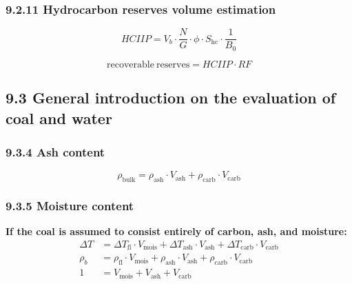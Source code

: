 \subsubsection{9.2.11 Hydrocarbon reserves volume estimation}
\begin{equation*}
    \mathit{HCIIP} = V_b\cdot \frac{N}{G} \cdot\phi\cdot S_\mathrm{hc}\cdot\frac{1}{B_0}\tag{9A.17}
\end{equation*}

\begin{equation*}
    \mathrm{recoverable\ reserves} = \mathit{HCIIP}\cdot \mathit{RF}\tag{9A.18}
\end{equation*}

\subsection{9.3 General introduction on the evaluation of coal and water}
\subsubsection{9.3.4 Ash content}
\begin{equation*}
    \rho_\mathrm{bulk} = \rho_\mathrm{ash}\cdot V_\mathrm{ash} + \rho_\mathrm{carb}\cdot V_\mathrm{carb}\tag{9B.1}
\end{equation*}

\subsubsection{9.3.5 Moisture content}
\textbf{If the coal is assumed to consist entirely of carbon, ash, and moisture:}
% 
% 
\begin{align}
    \Delta T & = \Delta T_\mathrm{fl}\cdot V_\mathrm{mois} + \Delta T_\mathrm{ash}\cdot V_\mathrm{ash} + \Delta T_\mathrm{carb}\cdot V_\mathrm{carb}\tag{9B.2} \\
    \rho_b   & = \rho_\mathrm{fl}\cdot V_\mathrm{mois} + \rho_\mathrm{ash}\cdot V_\mathrm{ash} + \rho_\mathrm{carb}\cdot V_\mathrm{carb}\tag{9B.3}             \\
    1        & = V_\mathrm{mois} + V_\mathrm{ash} + V_\mathrm{carb}\tag{9B.4}
\end{align}

